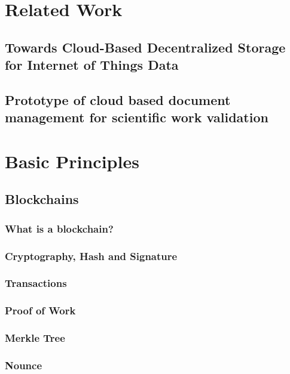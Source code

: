 \section{Related Work}


\subsection{Towards Cloud-Based Decentralized Storage for Internet of Things Data}
\subsection{Prototype of cloud based document management for scientific work validation}

\section{Basic Principles}

\subsection{Blockchains}

\subsubsection{What is a blockchain?}
\subsubsection{Cryptography, Hash and Signature}
\subsubsection{Transactions}
\subsubsection{Proof of Work}
\subsubsection{Merkle Tree}
\subsubsection{Nounce}

